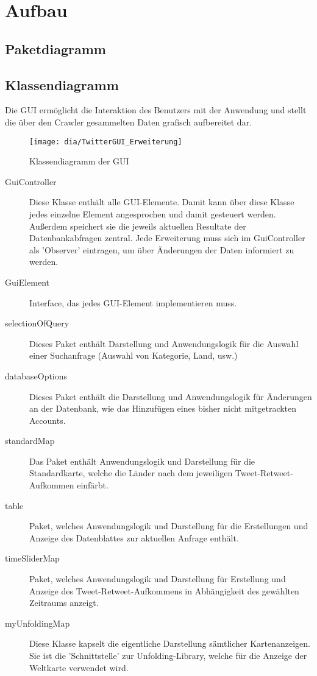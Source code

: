 \section{Aufbau}
\subsection{Paketdiagramm}
\subsection{Klassendiagramm}
Die GUI ermöglicht die Interaktion des Benutzers mit der Anwendung und stellt die über den Crawler gesammelten Daten grafisch aufbereitet dar. 
\begin{figure}[h!]
	\centering
	\texttt{[image: dia/TwitterGUI\_Erweiterung]}
	\caption{Klassendiagramm der GUI}
	\label{fig:GUI}
\end{figure}
\begin{description}
	\item[GuiController] Diese Klasse enthält alle GUI-Elemente. Damit kann über diese Klasse jedes einzelne Element angesprochen und damit gesteuert werden. Außerdem speichert sie die jeweils aktuellen Resultate der Datenbankabfragen zentral. Jede Erweiterung muss sich im GuiController als 'Observer' eintragen, um über Änderungen der Daten informiert zu werden. 
	\item[GuiElement] Interface, das jedes GUI-Element implementieren muss.
	\item [selectionOfQuery] Dieses Paket enthält Darstellung und Anwendungslogik für die Auswahl einer Suchanfrage (Auswahl von Kategorie, Land, usw.)
	\item[databaseOptions] Dieses Paket enthält die Darstellung und Anwendungslogik für Änderungen an der Datenbank, wie das Hinzufügen eines bisher nicht mitgetrackten Accounts.
	
	\item [standardMap] Das Paket enthält Anwendungslogik und Darstellung für die Standardkarte, welche die Länder nach dem jeweiligen Tweet-Retweet-Aufkommen einfärbt.
	\item [table] Paket, welches Anwendungslogik und Darstellung für die Erstellungen und Anzeige des Datenblattes zur aktuellen Anfrage enthält.
	\item [timeSliderMap] Paket, welches Anwendungslogik und Darstellung für Erstellung und Anzeige des Tweet-Retweet-Aufkommens in Abhängigkeit des gewählten Zeitraums anzeigt.
	\item [myUnfoldingMap] Diese Klasse kapselt die eigentliche Darstellung sämtlicher Kartenanzeigen. Sie ist die 'Schnittstelle' zur Unfolding-Library, welche für die Anzeige der Weltkarte verwendet wird.
\end{description}
